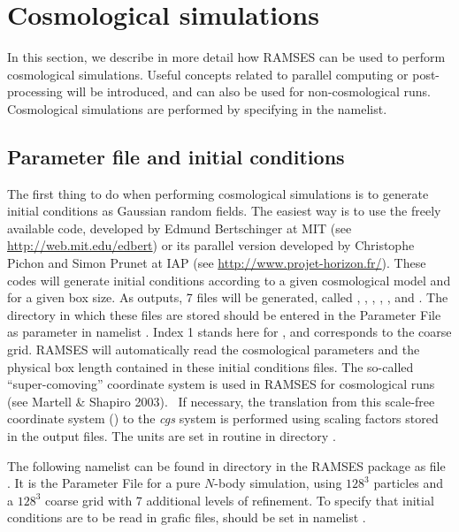 \clearpage
\section{Cosmological simulations}

In this section, we describe in more detail how RAMSES can be used to
perform cosmological simulations. Useful concepts related to parallel
computing or post-processing will be introduced, and can also be used
for non-cosmological runs. Cosmological simulations are performed by
specifying  in the 
namelist.

\subsection{Parameter file and initial conditions}
\label{sec:cosmo_init}

The first thing to do when performing cosmological simulations is to
generate initial conditions as Gaussian random fields. The easiest way
is to use the freely available  code, developed by Edmund
Bertschinger at MIT (see \url{http://web.mit.edu/edbert}) or its
parallel version  developed by Christophe Pichon and Simon
Prunet at IAP (see \url{http://www.projet-horizon.fr/}). These codes
will generate initial conditions according to a given cosmological model
and for a given box size. As outputs, 7 files will be generated, called
, , , ,
,  and . The directory in
which these files are stored should be entered in the Parameter File as
parameter  in namelist
. Index 1 stands here for ,
and corresponds to the coarse grid.  RAMSES will automatically read the
cosmological parameters and the physical box length contained in these
initial conditions files. The so-called ``super-comoving'' coordinate
system is used in RAMSES for cosmological runs (see Martell \& Shapiro
2003). \ If necessary, the translation from this scale-free coordinate
system () to the \emph{cgs} system is
performed using scaling factors stored in the output files. The units
are set in routine  in directory .

The following namelist can be found in directory  in the
RAMSES package as file . It is the Parameter File for a
pure $N$-body simulation, using $128^3$ particles and a $128^3$ coarse
grid with 7 additional levels of refinement. To specify that initial
conditions are to be read in grafic files,
 should be set in namelist
.

